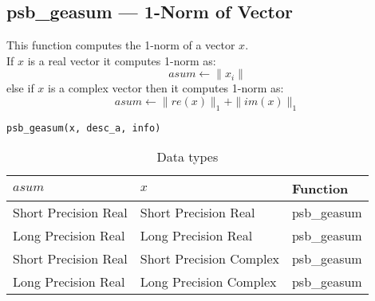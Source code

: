 %
%


\clearpage\subsection*{psb\_geasum --- 1-Norm of Vector}

This function computes the 1-norm of a vector $x$.\\
If $x$ is a real vector
it computes 1-norm as:
\[ asum \leftarrow  \|x_i\|\]
else if $x$ is a complex vector then it computes 1-norm  as:
\[ asum \leftarrow \|re(x)\|_1 + \|im(x)\|_1\]


\begin{verbatim}
psb_geasum(x, desc_a, info)
\end{verbatim}

\begin{table}[h]
\begin{center}
\begin{tabular}{lll}
\hline
$asum$ & $x$ & {\bf Function}\\
\hline
Short Precision Real&Short Precision Real & psb\_geasum \\
Long Precision Real&Long Precision Real & psb\_geasum \\
Short Precision Real&Short Precision Complex & psb\_geasum \\
Long Precision Real&Long Precision Complex & psb\_geasum \\
\hline
\end{tabular}
\end{center}
\caption{Data types\label{tab:f90asum}}
\end{table}

